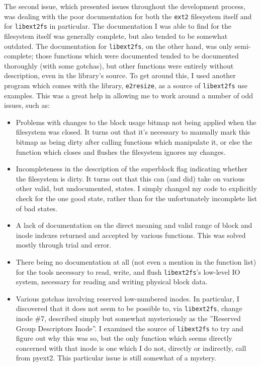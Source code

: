 \documentclass[10pt]{article}
\begin{document}
The second issue, which presented issues throughout the development process, was dealing with the poor documentation for both the \texttt{ext2} filesystem itself and for \texttt{libext2fs} in particular. The documentation I was able to find for the filesystem itself was generally complete, but also tended to be somewhat outdated. The documentation for \texttt{libext2fs}, on the other hand, was only semi-complete; those functions which were documented tended to be documented thoroughly (with some gotchas), but other functions were entirely without description, even in the library's source. To get around this, I used another program which comes with the library, \texttt{e2resize}, as a source of \texttt{libext2fs} use examples. This was a great help in allowing me to work around a number of odd issues, such as:
\begin{itemize}
 \item Problems with changes to the block usage bitmap not being applied when the filesystem was closed. It turns out that it's necessary to manually mark this bitmap as being dirty after calling functions which manipulate it, or else the function which closes and flushes the filesystem ignores my changes.
 \item Incompleteness in the description of the superblock flag indicating whether the filesystem is dirty. It turns out that this can (and did) take on various other valid, but undocumented, states. I simply changed my code to explicitly check for the one good state, rather than for the unfortunately incomplete list of bad states.
 \item A lack of documentation on the direct meaning and valid range of block and inode indexes returned and accepted by various functions. This was solved mostly through trial and error.
\item There being no documentation at all (not even a mention in the function list) for the tools necessary to read, write, and flush \texttt{libext2fs}'s low-level IO system, necessary for reading and writing physical block data.
\item Various gotchas involving reserved low-numbered inodes. In particular, I discovered that it does not seem to be possible to, via \texttt{libext2fs}, change inode \#7, described simply but somewhat mysteriously as the ''Reserved Group Descriptors Inode''. I examined the source of \texttt{libext2fs} to try and figure out why this was so, but the only function which seems directly concerned with that inode is one which I do not, directly or indirectly, call from pyext2. This particular issue is still somewhat of a mystery.
\end{itemize}
\end{document}
